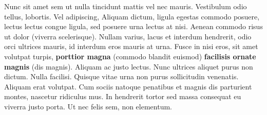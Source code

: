 \documentclass[a0paper,portrait]{baposter}
\begin{document}
\begin{poster}
{Nunc sit amet sem ut nulla tincidunt mattis vel nec mauris. Vestibulum odio tellus, lobortis. Vel adipiscing, Aliquam dictum, ligula egestas commodo posuere, lectus lectus congue ligula, sed posuere urna lectus at nisi. Aenean commodo risus ut dolor (viverra scelerisque). Nullam varius, lacus et interdum hendrerit, odio orci ultrices mauris, id interdum eros mauris at urna. Fusce in nisi eros, sit amet volutpat turpis, \textbf{porttior magna} (commodo blandit euismod) \textbf{facilisis ornate magnis} (dis magnis). Aliquam ac justo lectus. Nunc ultrices aliquet purus non dictum. Nulla facilisi. Quisque vitae urna non purus sollicitudin venenatis. Aliquam erat volutpat. Cum sociis natoque penatibus et magnis dis parturient montes, nascetur ridiculus mus. In hendrerit tortor sed massa consequat eu viverra justo porta. Ut nec felis sem, non elementum.
}


\end{poster}
\end{document}
